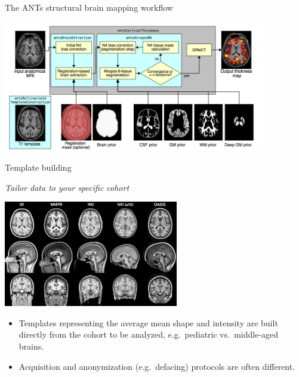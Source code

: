 \documentclass[ignorenonframetext,]{beamer}
\providecommand{\tightlist}{%
  \setlength{\itemsep}{0pt}\setlength{\parskip}{0pt}}
\begin{document}
\begin{frame}{The ANTs structural brain mapping workflow}

\begin{centering}

\includegraphics[width=4.5in]{./evaluation/figures/pipeline.png}

\end{centering}

\end{frame}

\begin{frame}{Template building}

\emph{Tailor data to your specific cohort}

\begin{centering}

\includegraphics[width=3in]{./evaluation/figures/templates.png}

\end{centering}

\small

\begin{itemize}
\tightlist
\item
  Templates representing the average mean shape and intensity are built
  directly from the cohort to be analyzed, e.g.~pediatric
  vs.~middle-aged brains.\\
\item
  Acquisition and anonymization (e.g.~defacing) protocols are often
  different.
\end{itemize}

\end{frame}
\end{document}
